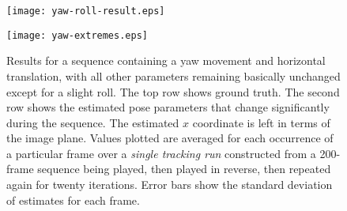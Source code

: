 \begin{figure}[tbp]
\centerline{\texttt{[image: yaw-roll-result.eps]}}
\centerline{\texttt{[image: yaw-extremes.eps]}}
\caption{ 
%
  Results for a sequence containing a yaw movement and horizontal
  translation, with all other parameters remaining basically unchanged
  except for a slight roll.  The top row shows ground truth.  The
  second row shows the estimated pose parameters that change
  significantly during the sequence.  The estimated $x$ coordinate is
  left in terms of the image plane.  Values plotted are averaged for
  each occurrence of a particular frame over a {\em single tracking
    run} constructed from a 200-frame sequence being played, then
  played in reverse, then repeated again for twenty iterations.  Error
  bars show the standard deviation of estimates for each frame.
%
}
\label{fig:yaw-roll-result}
\end{figure}
